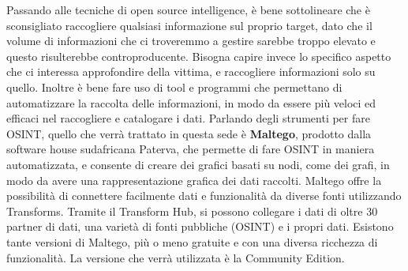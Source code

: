 \begin{flushleft}
Passando alle tecniche di open source intelligence, è bene sottolineare che è sconsigliato raccogliere qualsiasi informazione sul proprio target, dato che il volume di informazioni che ci troveremmo a gestire sarebbe troppo elevato e questo risulterebbe controproducente. Bisogna capire invece lo specifico aspetto che ci interessa approfondire della vittima, e raccogliere informazioni solo su quello. Inoltre è bene fare uso di tool e programmi che permettano di automatizzare la raccolta delle informazioni, in modo da essere più veloci ed efficaci nel raccogliere e catalogare i dati. Parlando degli strumenti per fare OSINT, quello che verrà trattato in questa sede è \textbf{Maltego}, prodotto dalla software house sudafricana Paterva, che permette di fare OSINT in maniera automatizzata, e consente di creare dei grafici basati su nodi, come dei grafi, in modo da avere una rappresentazione grafica dei dati raccolti. Maltego offre la possibilità di connettere facilmente dati e funzionalità da diverse fonti utilizzando Transforms. Tramite il Transform Hub, si possono collegare i dati di oltre 30 partner di dati, una varietà di fonti pubbliche (OSINT) e i propri dati. Esistono tante versioni di Maltego, più o meno gratuite e con una diversa ricchezza di funzionalità. La versione che verrà utilizzata è la Community Edition.
\end{flushleft}